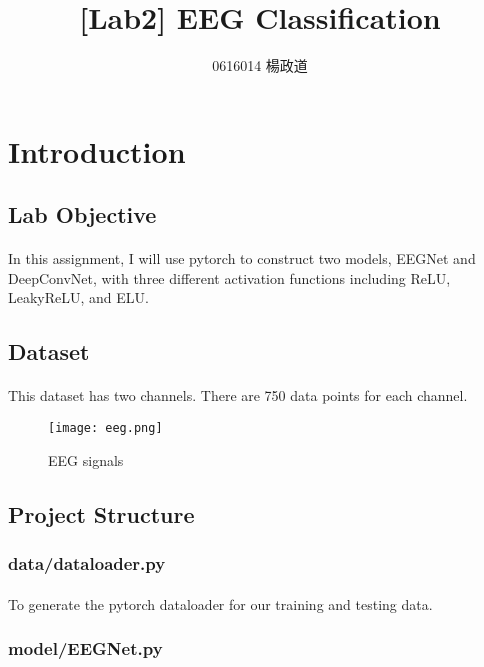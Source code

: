 \title{[Lab2] EEG Classification}
\author{0616014 楊政道}
\maketitle
\thispagestyle{fancy}
\section{Introduction}
\subsection{Lab Objective}
\paragraph{}
In this assignment, I will use pytorch to construct two models, EEGNet and DeepConvNet, with three different activation functions including ReLU, LeakyReLU, and ELU.
\subsection{Dataset}
\paragraph{}
This dataset has two channels. There are 750 data points for each channel. 
\begin{figure}[!ht]
    \begin{center} 
        \texttt{[image: eeg.png]} 
        \caption{EEG signals}
    \end{center} 
\end{figure}
\subsection{Project Structure}
\subsubsection{data/dataloader.py}
\paragraph{}
To generate the pytorch dataloader for our training and testing data.
\subsubsection{model/EEGNet.py}
